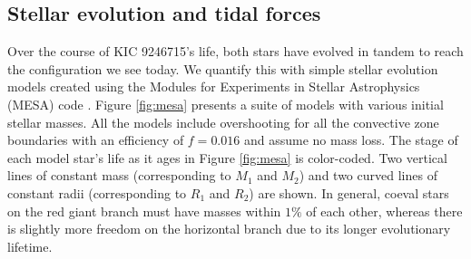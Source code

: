 \subsection{Stellar evolution and tidal forces}\label{tides}

Over the course of KIC 9246715's life, both stars have evolved in tandem to reach the configuration we see today. We quantify this with simple stellar evolution models created using the Modules for Experiments in Stellar Astrophysics (MESA) code \citep{pax11,pax13,pax15}. Figure \ref{fig:mesa} presents a suite of models with various initial stellar masses. All the models include overshooting for all the convective zone boundaries with an efficiency of $f = 0.016$ \citep{her00} and assume no mass loss. The stage of each model star's life as it ages in Figure \ref{fig:mesa} is color-coded. Two vertical lines of constant mass (corresponding to $M_1$ and $M_2$) and two curved lines of constant radii (corresponding to $R_1$ and $R_2$) are shown. In general, coeval stars on the red giant branch must have masses within $1\%$ of each other, whereas there is slightly more freedom on the horizontal branch due to its longer evolutionary lifetime.

